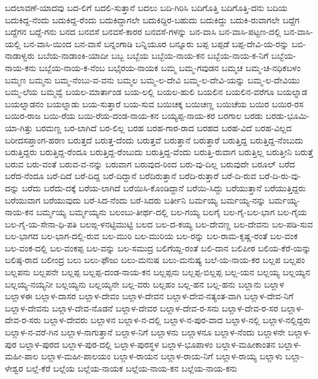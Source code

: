 {ಬದಲಾವಣೆ-ಯಾದವು
ಬದ-ಲಿಗೆ
ಬದಲಿ-ಸುತ್ತಾನೆ
ಬದಲು
ಬದಿ-ಗಿರಿಸಿ
ಬದಿಗೊತ್ತಿ
ಬದಿಗೊತ್ತಿ-ದನು
ಬದಿಯ
ಬದುಕಿದ್ದ-ನೆಂದು
ಬದುಕಿದ್ದ-ರೆಂದು
ಬದುಕಿದ್ದಾಗಲೇ
ಬದುಕಿದ್ದಿರ-ಬಹುದು
ಬದುಕಿದ್ದು
ಬದುಕಿ-ರುವಾಗಲೇ
ಬದ್ದೆಗ
ಬದ್ದೆಗನ
ಬದ್ದೆ-ಗನು
ಬನದ
ಬನವಸೆ
ಬನವಸೆ-ಕಾರರ
ಬನವಸೆ-ಗಳನ್ನು
ಬನ-ವಾಸಿ
ಬನ-ವಾಸಿ-ಪಟ್ಟಣ-ದಲ್ಲಿ
ಬನ-ವಾಸಿ-ಯಲ್ಲಿ
ಬನ-ವಾಸಿ-ಯಿಂದ
ಬನ-ವಾಸೆ
ಬನ್ನಂಗಾಡಿ
ಬನ್ನಿಯೂರ
ಬನ್ನೂರು
ಬಪ್ಪ
ಬಪ್ಪಡೆ
ಬಪ್ಪ-ದೇವಿ-ಯ-ರನ್ನು
ಬಬಿ-ನಾಡಾಳ್ವರು
ಬಬೆಯ-ನಾಡಾಂಕಿ-ಯಾದೀ
ಬಬ್ಬ
ಬಬ್ಬೆಯ
ಬಬ್ಬೆಯ-ನಾಯ-ಕನ
ಬಬ್ಬೆಯ-ನಾಯ-ಕ-ನಿಗೆ
ಬಬ್ಬೆಯ-ನಾಯ-ಕನು
ಬಬ್ಬೆಯ-ನಾಯ-ಕ-ನೆಂಬ
ಬಭೈರಯ-ನಾಯಕ
ಬಮ್ಮ
ಬಮ್ಮ-ಗವುಡನ
ಬಮ್ಮಚ
ಬಮ್ಮ-ಚ-ನಧಿಕಬಳಂ
ಬಮ್ಮಣ
ಬಮ್ಮನು
ಬಮ್ಮ-ನೆಂಬು-ವ-ವನು
ಬಮ್ಮಲ
ಬಮ್ಮ-ಲ-ದೇವಿ
ಬಮ್ಮ-ಲ-ದೇವಿ-ಯನ್ನು
ಬಮ್ಮ-ಲ-ದೇವಿಯು
ಬಮ್ಮ-ಲೆಯ
ಬಮ್ಮವ್ವೆ
ಬಯಲ-ಮಾರ್ತಾಂಡ
ಬಯ-ಲಲ್ಲಿ
ಬಯಲ-ಹುಲಿ
ಬಯಲಿನ
ಬಯಲಿನ-ವರೆಗೂ
ಬಯಲ್ನಾಡ
ಬಯಲ್ನಾಡನಂ
ಬಯಲ್ನಾಡು
ಬಯ-ಸುತ್ತಾರೆ
ಬಯ-ಸುವ
ಬಯಿಚಕ್ಕ
ಬಯಿಚಣ್ಣ
ಬಯಿಚೆಯ
ಬಯಿರ
ಬಯಿರ-ರಸ
ಬಯಿರ-ರಾಜ
ಬಯಿ-ರೆಯ
ಬಯಿ-ರೆಯ-ದಂಡ-ನಾಯ-ಕನ
ಬಯ್ಯಪ್ಪ-ನಾಯ-ಕರ
ಬರಗಾಲ
ಬರಡು
ಬರಡು-ಭೂಮಿ-ಯಾ-ಗಿತ್ತು
ಬರಮಣ್ಣ
ಬರ-ಲಾಗಿದೆ
ಬರ-ಲಿಲ್ಲ
ಬರಹ
ಬರಹ-ಗಾರ-ರಾದ
ಬರಹದ
ಬರಹ-ವಿದೆ
ಬರಹ-ವಿಲ್ಲದ
ಬರೀದಸಪ್ತಾಂಗ-ಹರಣ
ಬರುತ್ತದೆ
ಬರುತ್ತ-ದೆಂದು
ಬರುತ್ತವೆ
ಬರುತ್ತಾನೆ
ಬರುತ್ತಾರೆ
ಬರುತ್ತಿದ್ದ
ಬರುತ್ತಿದ್ದ-ನೆಂಬುದು
ಬರುತ್ತಿದ್ದರು
ಬರುತ್ತಿದ್ದ-ರೆಂದೂ
ಬರುತ್ತಿದ್ದ-ರೆಂಬುದು
ಬರುತ್ತಿದ್ದ-ವೆಂದು
ಬರುತ್ತಿ-ರುವಾಗ
ಬರುತ್ತಿಲ್ಲ
ಬರುತ್ತೀನಿ
ಬರುತ್ತೆ
ಬರುವ
ಬರು-ವಂತೆ
ಬರುವ-ವ-ನನ್ನು
ಬರುವಾಗ
ಬರುವುದ-ರಿಂದ
ಬರು-ವು-ದಿಲ್ಲ
ಬರುವುದೇ
ಬರೂಲ್
ಬರೆದ
ಬರೆದ-ನೆಂದೂ
ಬರೆ-ದಿದೆ
ಬರೆ-ದಿದ್ದ
ಬರೆ-ದಿದ್ದಾನೆ
ಬರೆದಿರುತ್ತಾನೆ
ಬರೆದಿ-ರುತ್ತಾರೆ
ಬರೆ-ದಿ-ರುವ
ಬರೆ-ದಿ-ರು-ವು-ದನ್ನು
ಬರೆದು
ಬರೆದು-ದಕ್ಕೆ
ಬರೆಯ-ಲಾಗಿದೆ
ಬರೆಯಿಸಿ-ಕೊಂಡಿದ್ದಾನೆ
ಬರೆಯಿ-ಸಿದ್ದು
ಬರೆಯುತ್ತಾನೆ
ಬರೆಯುತ್ತಿದ್ದರು
ಬರೆಯುವಾಗ
ಬರೆಯುವುದು
ಬರೆ-ಸಿದ-ನೆಂದು
ಬರೆ-ಸಿದರು
ಬರ್ತೀನಿ
ಬರ್ಮಯ್ಯ
ಬರ್ಮಯ್ಯ-ನನ್ನು
ಬರ್ಮಯ್ಯ-ನಾಯ-ಕನ
ಬರ್ಮ್ಮಯ್ಯ
ಬರ್ಮ್ಮಯ್ಯನು
ಬಲಂಬು-ತೀರ್ಥ-ದಲ್ಲಿ
ಬಲ-ಗಯ್ಯ
ಬಲಗೈ
ಬಲ-ಗೈ-ಬಲ-ಭಾಗ
ಬಲ-ಗೈಯ
ಬಲ-ಗೈ-ಯ-ಸೇನಾ-ಧಿ-ಪತಿ
ಬಲಙ್ಗ-ಳನಟ್ಟಿಮುಟ್ಟಿ
ಬಲದ
ಬಲ-ದ-ಕಯ್ಯ
ಬಲ-ದೇವಣ್ಣ
ಬಲ-ದೇವನು
ಬಲ-ಪಡಿ-ಸುವ
ಬಲ-ಭಾಗದ
ಬಲ-ಭಾಗ-ದಲ್ಲಿ-ರುವ
ಬಲ-ಮುರಿ
ಬಲ-ಮುರಿಯ
ಬಲ-ರನ್ನು
ಬಲ-ರಾಮ-ಕೃಷ್ಣ-ರಂತೆ
ಬಲ-ವಂಕ
ಬಲ-ವಂಕ-ದಲ್ಲಿ
ಬಲ-ವಂಕಪ್ಪ
ಬಲ-ವನ್ನು
ಬಲ-ಸಮುದ್ರ
ಬಲಿಗೆಯ್ದ-ರಂತೆ
ಬಲಿ-ದಾನ
ಬಲಿಪೀಠ
ಬಲಿಯ-ಕೆರೆ-ಯನ್ನು
ಬಲಿಷ್ಠ-ರಾದ
ಬಲೀಂದ್ರ
ಬಲು
ಬಲು-ಫೌಜು
ಬಲು-ಮನುಷ
ಬಲು-ಮನುಷ್ಯ
ಬಲೆ-ಯ-ನಾಯ-ಕರ
ಬಲ್ಲಪ
ಬಲ್ಲಪಂ
ಬಲ್ಲಪನು
ಬಲ್ಲಪನೇ
ಬಲ್ಲಪ್ಪ
ಬಲ್ಲಪ್ಪ-ದಂಡ-ನಾಯ-ಕನ
ಬಲ್ಲಪ್ಪನು
ಬಲ್ಲಪ್ಪ-ಬಿಲ್ಲಪ್ಪ
ಬಲ್ಲ-ಯನ
ಬಲ್ಲಯ್ಯ
ಬಲ್ಲಯ್ಯನ
ಬಲ್ಲಯ್ಯ-ನಯ್ಯನೀ
ಬಲ್ಲಯ್ಯನು
ಬಲ್ಲಯ್ಯನೇ
ಬಲ್ಲ-ವರು
ಬಲ್ಲಹಂ
ಬಲ್ಲ-ಹನ
ಬಲ್ಲ-ಹನು
ಬಲ್ಲಾನು
ಬಲ್ಲಾಳ
ಬಲ್ಲಾಳಈ
ಬಲ್ಲಾಳ-ದಾಸರ
ಬಲ್ಲಾಳ-ದೇವಂ
ಬಲ್ಲಾಳ-ದೇವನ
ಬಲ್ಲಾಳ-ದೇವ-ನತ್ಯಂತ-ವಾಗಿ
ಬಲ್ಲಾಳ-ದೇವ-ನಿಗೆ
ಬಲ್ಲಾಳ-ದೇವನು
ಬಲ್ಲಾಳ-ದೇವ-ನೊಡನೆ
ಬಲ್ಲಾಳ-ದೇವರ
ಬಲ್ಲಾಳ-ದೇವ-ರ-ಸನು
ಬಲ್ಲಾಳ-ದೇವ-ರ-ಸರ
ಬಲ್ಲಾಳ-ದೇವ-ರ-ಸರು
ಬಲ್ಲಾಳ-ದೇವರು
ಬಲ್ಲಾಳನ
ಬಲ್ಲಾಳ-ನ-ದಲ್ಲಿ
ಬಲ್ಲಾಳ-ನ-ಪುರ-ವಾದ
ಬಲ್ಲಾಳ-ನಲ್ಲಿ
ಬಲ್ಲಾಳ-ನಲ್ಲಿದ್ದರು
ಬಲ್ಲಾಳ-ನ-ವರೆ-ಗಿನ
ಬಲ್ಲಾಳ-ನಾಗುತ್ತಾನೆ
ಬಲ್ಲಾಳ-ನಿಗೆ
ಬಲ್ಲಾಳನು
ಬಲ್ಲಾಳನೂ
ಬಲ್ಲಾಳ-ನೆಂದು
ಬಲ್ಲಾಳನೇ
ಬಲ್ಲಾಳ-ಪುರ
ಬಲ್ಲಾಳ-ಪುರದ
ಬಲ್ಲಾಳ-ಪುರ-ದಲ್ಲಿ
ಬಲ್ಲಾಳ-ಪುರಸ್ಥಳ
ಬಲ್ಲಾಳ-ಭೂಪಾಳಂ
ಬಲ್ಲಾಳ-ಮಹೀಕಾಂತನ
ಬಲ್ಲಾಳ-ಮಹೀ-ಪಾಲ
ಬಲ್ಲಾಳ-ಮಹೀ-ಪಾಲಯಂ
ಬಲ್ಲಾಳ-ರಾಯನ
ಬಲ್ಲಾಳ-ರಾಯ-ನಿಗೆ
ಬಲ್ಲಾಳ-ರಾಯ್ಯ
ಬಲ್ಲಾಳು
ಬಲ್ಲಾ-ಳೇಶ್ವರ
ಬಲ್ಲೆ-ಕೆರೆ
ಬಲ್ಲೆಯ
ಬಲ್ಲೆಯ-ನಾಯಕ
ಬಲ್ಲೆಯ-ನಾಯ-ಕನ
ಬಲ್ಲೆಯ-ನಾಯ-ಕನು
}
